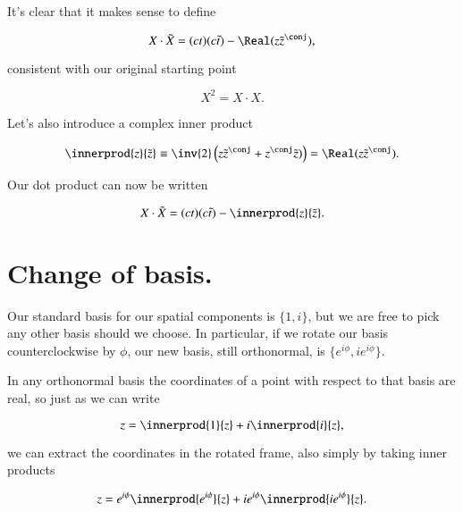 It's clear that it makes sense to define

\begin{equation}\label{eqn:complexPlanarBoost:50}
X \cdot \tilde{X} = (ct) (c \tilde{t}) - \Real (z \tilde{z}^\conj),
\end{equation}

consistent with our original starting point

\begin{equation}\label{eqn:complexPlanarBoost:70}
X^2 = X \cdot X.
\end{equation}

Let's also introduce a complex inner product

\begin{equation}\label{eqn:complexPlanarBoost:90}
\innerprod{z}{\tilde{z}} \equiv \inv{2} \left( z \tilde{z}^\conj + z^\conj \tilde{z}) \right) = \Real (z \tilde{z}^\conj).
\end{equation}

Our dot product can now be written

\begin{equation}\label{eqn:complexPlanarBoost:110}
X \cdot \tilde{X} = (ct) (c \tilde{t}) - \innerprod{z}{\tilde{z}}.
\end{equation}

\section{Change of basis.}

Our standard basis for our spatial components is $\{1, i\}$, but we are free to pick any other basis should we choose.  In particular, if we rotate our basis counterclockwise by $\phi$, our new basis, still orthonormal, is $\{ e^{i\phi}, i e^{i\phi} \}$.

In any orthonormal basis the coordinates of a point with respect to that basis are real, so just as we can write

\begin{equation}\label{eqn:complexPlanarBoost:130}
z = \innerprod{1}{z} + i \innerprod{i}{z},
\end{equation}

we can extract the coordinates in the rotated frame, also simply by taking inner products

\begin{equation}\label{eqn:complexPlanarBoost:150}
z = e^{i \phi} \innerprod{e^{i \phi}}{z} + i e^{i\phi} \innerprod{i e^{i\phi} }{z}.
\end{equation}


